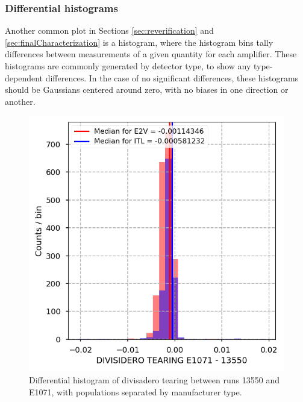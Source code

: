 \clearpage
\subsubsection{Differential histograms}

Another common plot in Sections \ref{sec:reverification} and \ref{sec:finalCharacterization} is a histogram, where the histogram bins tally differences between measurements of a given quantity for each amplifier. These histograms are commonly generated by detector type, to show any type-dependent differences. In the case of no significant differences, these histograms should be Gaussians centered around zero, with no biases in one direction or another. %

\begin{figure}
    \centering
    \includegraphics[width=0.8\linewidth]{figures/baselineCharacterization/DIVISIDERO_TEARING_13550_E1071_diff.png}
    \caption{Differential histogram of divisadero tearing between runs 13550 and E1071, with populations separated by manufacturer type.}
    \label{fig:ref:histDiff}
\end{figure}

\clearpage

